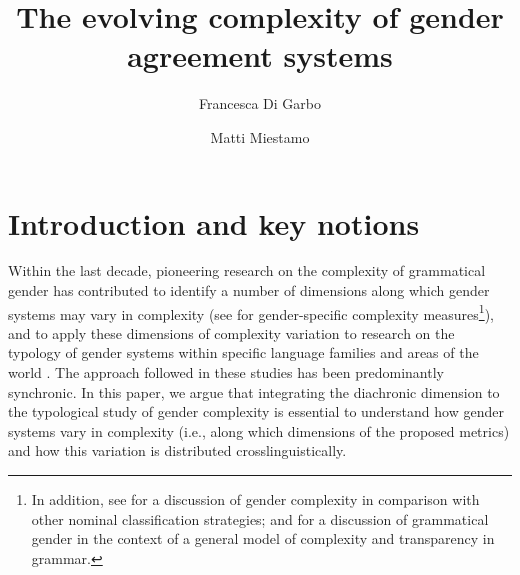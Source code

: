 \documentclass[output=collectionpaper]{langsci/langscibook}
\author{Francesca Di Garbo%
\affiliation{Stockholm University}%
\and%
Matti Miestamo%
\affiliation{University of Helsinki}%
}%
\title{The evolving complexity of gender agreement systems}
\begin{document}
\section{Introduction and key notions}
\label{intro2}
Within the last decade, pioneering research on the complexity of grammatical gender has contributed to identify a number of dimensions along which gender systems may vary in complexity (see \citealt{Audring2014,Audring2017,DiGarbo2016} for gender-specific complexity measures\footnote{In addition, see \citet{Passer2016b} for a discussion of gender complexity in comparison with other nominal classification strategies; and \citet{Leufkens2015} for a discussion of grammatical gender in the context of a general model of complexity and transparency in grammar.}), and to apply these dimensions of complexity variation to research on the typology of gender systems within specific language families and areas of the world \citep{DiGarbo2016}. The approach followed in these studies has been predominantly synchronic. In this paper, we argue that integrating the diachronic dimension to the typological study of gender complexity is essential to understand how gender systems vary in complexity (i.e., along which dimensions of the proposed metrics) and how this variation is distributed crosslinguistically.
\end{document}
